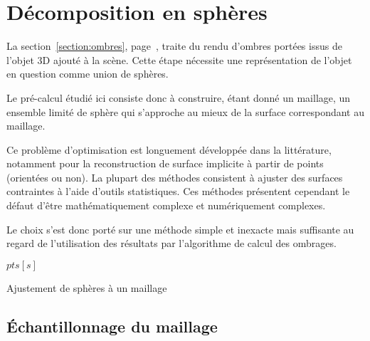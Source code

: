 \documentclass[10pt,a4paper,twoside, twocolumn]{report}
\begin{document}
\section{Décomposition en sphères}
La section~\ref{section:ombres}, page~\pageref{section:ombres}, traite du rendu d'ombres portées issus de l'objet 3D ajouté à la scène. Cette étape nécessite une représentation de l'objet en question comme union de sphères.

Le pré-calcul étudié ici consiste donc à construire, étant donné un maillage, un ensemble limité de sphère qui s'approche au mieux de la surface correspondant au maillage.

Ce problème d'optimisation est longuement développée dans la littérature\cite{Marshall1997}\cite{Gross2003}, notamment pour la reconstruction de surface implicite à partir de points (orientées ou non). La plupart des méthodes consistent à ajuster des surfaces contraintes à l'aide d'outils statistiques. Ces méthodes présentent cependant le défaut d’être mathématiquement complexe et numériquement complexes.

Le choix s'est donc porté sur une méthode simple et inexacte mais suffisante au regard de l'utilisation des résultats par l'algorithme de calcul des ombrages.

\begin{algorithm}[ht]

	\BlankLine
	\Point $pts[s]$\;
	\BlankLine
	\BlankLine
	\;
	\caption{Ajustement de sphères à un maillage}
\end{algorithm}

\subsection{Échantillonnage du maillage}
\end{document}

